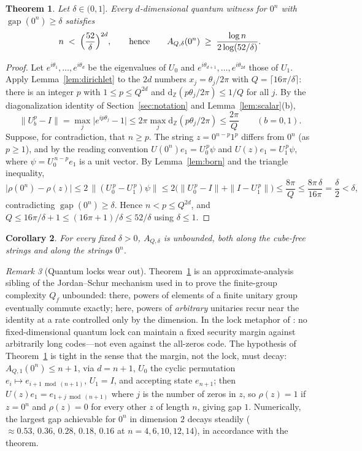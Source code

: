 \documentclass[11pt]{amsart}
\newtheorem{theorem}{Theorem}[section]
\newtheorem{corollary}[theorem]{Corollary}
\theoremstyle{definition}
\theoremstyle{remark}
\newtheorem{remark}[theorem]{Remark}
\newcommand{\Z}{\mathbb{Z}}
\newcommand{\gapp}{\operatorname{gap}}
\newcommand{\dz}[1]{\mathrm{d}_{\Z}(#1)}
\begin{document}
\begin{theorem}\label{thm:zeros}
Let $\delta\in(0,1]$. Every $d$-dimensional quantum witness for $0^n$
with $\gapp(0^n)\ge\delta$ satisfies
\[
  n\;<\;\Bigl(\frac{52}{\delta}\Bigr)^{2d},
  \qquad\text{hence}\qquad
  A_{Q,\delta}(0^n)\;\ge\;\frac{\log n}{2\log(52/\delta)} .
\]
\end{theorem}

\begin{proof}
Let $e^{i\theta_1},\dots,e^{i\theta_d}$ be the eigenvalues of $U_0$
and $e^{i\theta_{d+1}},\dots,e^{i\theta_{2d}}$ those of $U_1$. Apply
Lemma~\ref{lem:dirichlet} to the $2d$ numbers $x_j=\theta_j/2\pi$ with
$Q=\lceil16\pi/\delta\rceil$: there is an integer $p$ with
$1\le p\le Q^{2d}$ and $\dz{p\theta_j/2\pi}\le1/Q$ for all $j$. By the
diagonalization identity of Section~\ref{sec:notation} and
Lemma~\ref{lem:scalar}(b),
\[
  \|U_b^p-I\|=\max_j\bigl|e^{ip\theta_j}-1\bigr|
  \le2\pi\max_j\dz{p\theta_j/2\pi}\le\frac{2\pi}{Q}
  \qquad(b=0,1).
\]
Suppose, for contradiction, that $n\ge p$. The string
$z=0^{n-p}1^p$ differs from $0^n$ (as $p\ge1$), and by the reading
convention $U(0^n)e_1=U_0^{\,p}\psi$ and $U(z)e_1=U_1^{\,p}\psi$,
where $\psi=U_0^{\,n-p}e_1$ is a unit vector. By
Lemma~\ref{lem:born} and the triangle inequality,
\[
  \bigl|\rho(0^n)-\rho(z)\bigr|
  \le2\,\bigl\|(U_0^{\,p}-U_1^{\,p})\psi\bigr\|
  \le2\bigl(\|U_0^{\,p}-I\|+\|I-U_1^{\,p}\|\bigr)
  \le\frac{8\pi}{Q}\le\frac{8\pi\,\delta}{16\pi}=\frac\delta2<\delta,
\]
contradicting $\gapp(0^n)\ge\delta$. Hence $n<p\le Q^{2d}$, and
$Q\le16\pi/\delta+1\le(16\pi+1)/\delta\le52/\delta$ using
$\delta\le1$.
\end{proof}

\begin{corollary}\label{cor:unbounded}
For every fixed $\delta>0$, $A_{Q,\delta}$ is unbounded, both along
the cube-free strings and along the strings $0^n$.
\end{corollary}

\begin{remark}[Quantum locks wear out]\label{rem:wear}
Theorem~\ref{thm:zeros} is an approximate-analysis sibling of the
Jordan--Schur mechanism used in \cite{KH17} to prove the
finite-group complexity $Q_f$ unbounded: there, powers of elements of
a finite unitary group eventually commute exactly; here, powers of
\emph{arbitrary} unitaries recur near the identity at a rate
controlled only by the dimension. In the lock metaphor of
\cite{KH17}: no fixed-dimensional quantum lock can maintain a fixed
security margin against arbitrarily long codes---not even against the
all-zeros code. The hypothesis of Theorem~\ref{thm:zeros} is tight in
the sense that the margin, not the lock, must decay:
$A_{Q,1}(0^n)\le n+1$, via $d=n+1$, $U_0$ the cyclic permutation
$e_i\mapsto e_{i+1\bmod(n+1)}$, $U_1=I$, and accepting state
$e_{n+1}$; then $U(z)e_1=e_{1+j\bmod(n+1)}$ where $j$ is the number of
zeros in $z$, so $\rho(z)=1$ if $z=0^n$ and $\rho(z)=0$ for every
other $z$ of length $n$, giving gap $1$. Numerically, the largest gap
achievable for $0^n$ in dimension $2$ decays steadily
($\approx0.53,\,0.36,\,0.28,\,0.18,\,0.16$ at
$n=4,6,10,12,14$), in accordance with the theorem.
\end{remark}
\end{document}
